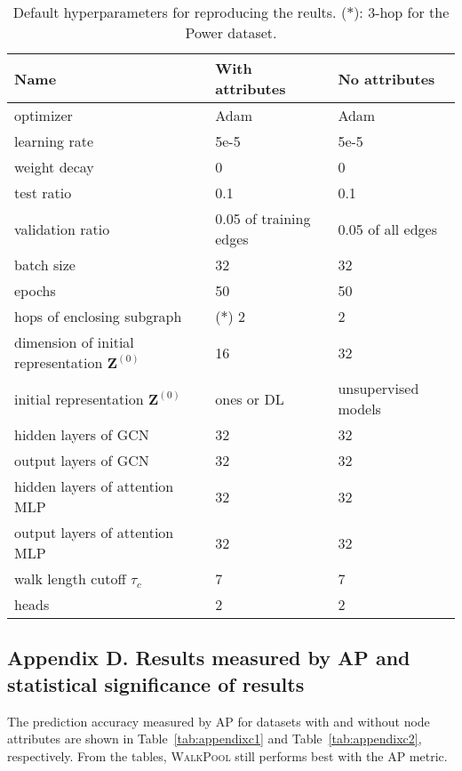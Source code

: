 \documentclass[11pt]{article}
\newcommand{\walkpool}{\textsc{WalkPool}\xspace}
\newcommand{\ra}[1]{\renewcommand{\arraystretch}{#1}}
\begin{document}
\begin{table}[h]
\centering
\ra{1}
\begin{tabular}{@{}lll@{}}
\toprule
      Name                   &  With attributes & No attributes\\ \midrule
      optimizer              &  Adam &  Adam\\
      learning rate          &  5e-5 &  5e-5\\
      weight decay           &  0 &  0\\
      test ratio             &  0.1 &  0.1\\
      validation ratio       &  0.05 of training edges &  0.05 of all edges\\
      batch size             &  32 &  32\\
      epochs                  &  50 &  50\\
      hops of enclosing subgraph        &  ($*$) 2 &  2\\
      dimension of initial representation $\mathbf{Z}^{(0)}$    &  16 &  32\\
      initial representation $\mathbf{Z}^{(0)}$      &  ones or DL &  unsupervised models\\
      hidden layers of GCN   &  32 &  32\\
      output layers of GCN   &  32 &  32\\
      hidden layers of attention MLP   &  32 &  32\\
      output layers of attention MLP   &  32 &  32\\
      walk length cutoff $\tau_c$  &  7 &  7\\
      heads                  &  2 &  2\\
  
\bottomrule

\end{tabular}
\caption{Default hyperparameters for reproducing the reults. ($*$): 3-hop for the Power dataset.}
\label{tab: appendixb}
\end{table}



\subsection*{Appendix D. Results measured by AP and statistical significance of results}
The prediction accuracy measured by AP for datasets with and without node attributes are shown in Table~\ref{tab:appendixc1} and Table~\ref{tab:appendixc2}, respectively. From the tables, \walkpool still performs best with the AP metric.
\end{document}
